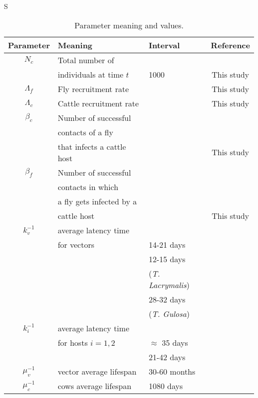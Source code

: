 S\documentclass[preprint,12pt]{elsarticle}
\begin{document}

\begin{table}[htb]
	\begin{center}
        \begin{tabular}{cllc}
			\hline
			Parameter		&	Meaning & Interval & Reference
			\\
			\midrule
			$N_c$& Total number of &&\\
			&individuals at time $t$ &1000&This study
			\\
			$\Lambda_f$& Fly recruitment rate & & This study
			\\
			$\Lambda_c$& Cattle recruitment rate & & This study
			\\			
			$\beta_c$& Number of successful &&\\
			&contacts of a fly &&
				\\
			& that infects a cattle host &&This study
				\\
			$\beta_f$& Number of successful&&\\
			&contacts in which &&
				\\
			& a fly gets infected by a &&\\
			&cattle host &&This study
				\\
			$k_v^{-1}$	& average latency time &&\\
			&for vectors & 14-21 days &\cite{Otranto:bookchapter}
			\\
				& & 12-15 days &\\
				&&(\textit{T. Lacrymalis}) &\cite{Chanie:2014}
			\\
				& & 28-32 days&\\ 
				&&(\textit{T. Gulosa}) &\cite{Chanie:2014}
			\\
			$k_{i}^{-1}$
			&
				average latency time &&\\
				&for hosts $i=1,2$ & $\approx$ 35 days& \cite{Otranto:bookchapter}
			\\
			& & 21-42 days& \cite{Chanie:2014}
			\\			
			 $\mu_v^{-1}$	& vector average lifespan & 30-60 months&\cite{sanchez:1998}
			\\
			$\mu_c^{-1}$
			&
				cows average lifespan & 1080 days& \cite{FAOweb}
			\\
    		\bottomrule
		\end{tabular}
	\end{center}
	\caption{
		Parameter meaning and values.}
    \label{Table:Parameters}
\end{table}
\end{document}
